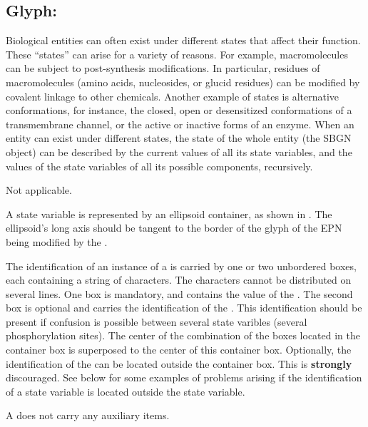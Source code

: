 
\subsection{Glyph: }
\label{sec:stateVariable}

Biological entities can often exist under different states that affect
their function.  These ``states'' can arise for a variety of reasons.  For
example, macromolecules can be subject to post-synthesis modifications.  In
particular, residues of macromolecules (amino acids, nucleosides, or glucid
residues) can be modified by covalent linkage to other chemicals.  Another
example of states is alternative conformations, for instance, the closed,
open or desensitized conformations of a transmembrane channel, or the
active or inactive forms of an enzyme.  When an entity can exist under
different states, the state of the whole entity (the SBGN object) can be
described by the current values of all its state variables, and the values
of the state variables of all its possible components, recursively.

\begin{glyphDescription}

\glyphSboTerm Not applicable.

\glyphContainer A state variable is represented by an ellipsoid
  container, as shown in .  The ellipsoid's long axis should
  be tangent to the border of the glyph of the EPN being modified by the
  .

  \glyphLabel The identification of an instance of a 
  is carried by one or two unbordered boxes, each containing a string of
  characters.  The characters cannot be distributed on several lines.  One
  box is mandatory, and contains the value of the .
  The second box is optional and carries the identification of the
  .  This identification should be present if
  confusion is possible between several state varibles (\eg several
  phosphorylation sites).  The center of the combination of the boxes
  located in the container box is superposed to the center of this
  container box.  Optionally, the identification of the  can be located outside the  container
  box.  This is \textbf{strongly} discouraged.  See 
  below for some examples of problems arising if the identification of a
  state variable is located outside the state variable.

\glyphAux A  does not carry any auxiliary items.  

\end{glyphDescription}

